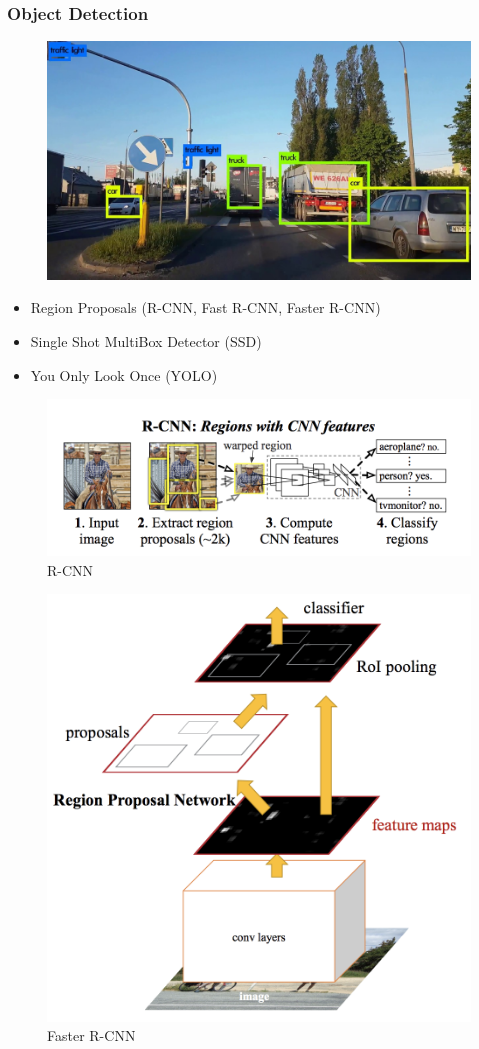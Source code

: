\documentclass[presentation]{beamer}
\begin{document}
\begin{frame}[allowframebreaks]
    \frametitle{Object Detection}

    \begin{figure}
        \centering
        \includegraphics[width=0.95\linewidth]{2.jpg}
        \caption{}
    \end{figure}

    \begin{itemize}
        \item Region Proposals (R-CNN, Fast R-CNN, Faster R-CNN)
        \item Single Shot MultiBox Detector (SSD)
        \item You Only Look Once (YOLO)
    \end{itemize}

    \begin{figure}
        \centering
        \includegraphics[width=0.99\linewidth]{2_2.png}
        \caption{R-CNN}
    \end{figure}

    \begin{figure}
        \centering
        \includegraphics[width=0.6\linewidth]{2_1.png}
        \caption{Faster R-CNN}
    \end{figure}


\end{frame}
\end{document}
